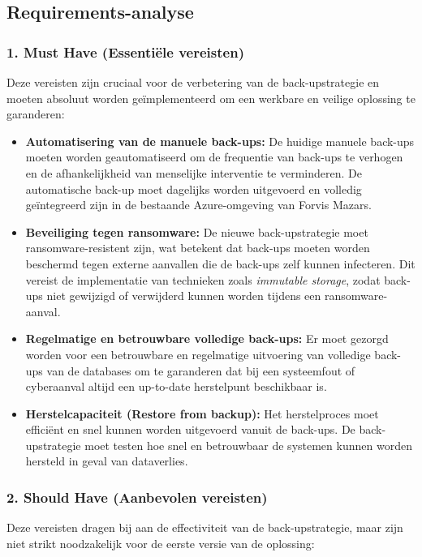 \subsection{Requirements-analyse}
\subsubsection{1. Must Have (Essentiële vereisten)}
Deze vereisten zijn cruciaal voor de verbetering van de back-upstrategie en moeten absoluut worden geïmplementeerd om een werkbare en veilige oplossing te garanderen:

\begin{itemize}
    \item \textbf{Automatisering van de manuele back-ups:} De huidige manuele back-ups moeten worden geautomatiseerd om de frequentie van back-ups te verhogen en de afhankelijkheid van menselijke interventie te verminderen. De automatische back-up moet dagelijks worden uitgevoerd en volledig geïntegreerd zijn in de bestaande Azure-omgeving van Forvis Mazars.
    
    \item \textbf{Beveiliging tegen ransomware:} De nieuwe back-upstrategie moet ransomware-resistent zijn, wat betekent dat back-ups moeten worden beschermd tegen externe aanvallen die de back-ups zelf kunnen infecteren. Dit vereist de implementatie van technieken zoals \textit{immutable storage}, zodat back-ups niet gewijzigd of verwijderd kunnen worden tijdens een ransomware-aanval.
    
    \item \textbf{Regelmatige en betrouwbare volledige back-ups:} Er moet gezorgd worden voor een betrouwbare en regelmatige uitvoering van volledige back-ups van de databases om te garanderen dat bij een systeemfout of cyberaanval altijd een up-to-date herstelpunt beschikbaar is.
    
    \item \textbf{Herstelcapaciteit (Restore from backup):} Het herstelproces moet efficiënt en snel kunnen worden uitgevoerd vanuit de back-ups. De back-upstrategie moet testen hoe snel en betrouwbaar de systemen kunnen worden hersteld in geval van dataverlies.
\end{itemize}

\subsubsection{2. Should Have (Aanbevolen vereisten)}
Deze vereisten dragen bij aan de effectiviteit van de back-upstrategie, maar zijn niet strikt noodzakelijk voor de eerste versie van de oplossing:

